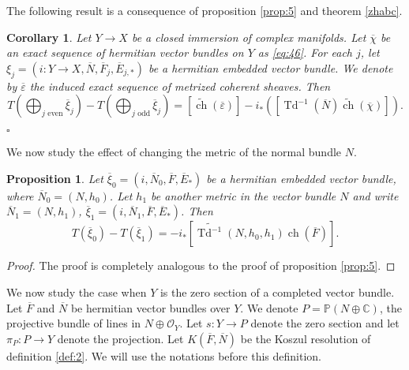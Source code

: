 \documentclass[10pt,twoside]{article}
\numberwithin{equation}{section}
\theoremstyle{plain}
\newtheorem{corollary}[equation]{Corollary}
\newtheorem{proposition}[equation]{Proposition}
\theoremstyle{definition}
\DeclareMathOperator{\Td}{Td}
\DeclareMathOperator{\ch}{ch}
\begin{document}
The following result is a consequence of proposition \ref{prop:5} and
theorem \ref{zhabc}.

\begin{corollary}\label{comparThevb} Let $Y\longrightarrow X$ be a closed immersion of
  complex manifolds.
  Let $\overline {\chi}$ be an exact sequence of hermitian vector
  bundles on $Y$ as \eqref{eq:46}. For each $j$, let
  $\xi_{j}=(i\colon Y\longrightarrow X,\overline N,\overline F_{j},\overline
  E_{j,\ast})$ be a hermitian embedded vector bundle. We denote by
  $\overline {\varepsilon }$ the induced exact sequence of metrized
  coherent sheaves. Then
  \begin{displaymath}
    T(\bigoplus_{j \text{ even} }\overline{\xi}_{j}) - T(\bigoplus
    _{j\text{ odd} }\overline {\xi}_j)=
    [\widetilde{\ch}(\overline \varepsilon )]-
    i_{\ast}([\Td^{-1}(\overline N)\widetilde{\ch}(\overline{\chi})]).
  \end{displaymath} 
\end{corollary}
\hfill$\square$


We now study the effect of changing the metric of the normal bundle
$N$.

\begin{proposition}\label{prop:15}
  Let $\overline {\xi}_{0}=(i,\overline
  N_{0},\overline F, \overline E_{\ast})$ be a hermitian embedded vector
  bundle, where $\overline N_{0}=(N,h_{0})$. Let $h_{1}$ be another
  metric in the vector bundle $N$ and 
  write $\overline N_{1}=(N,h_{1})$,  $\overline {\xi}_{1}=(i,\overline
  N_{1},\overline F, \overline E_{\ast})$. Then
  \begin{displaymath}
    T(\overline {\xi}_{0})-T(\overline
    {\xi}_{1})=-i_{\ast}[\widetilde{\Td^{-1}}(N,h_{0},h_{1})\ch(\overline
    F)].
  \end{displaymath}
\end{proposition}
\begin{proof}
  The proof is completely analogous to the proof of proposition \ref{prop:5}.  
\end{proof}

We now study the case when $Y$ is the zero section of a completed
vector bundle. Let $\overline F$ and $\overline N$ be hermitian
vector bundles over $Y$. We denote $P=\mathbb{P}(N\oplus
\mathbb{C})$, the projective bundle of lines in $N\oplus
\mathcal{O}_{Y}$. Let $s\colon Y\longrightarrow P$ denote the zero section
and let $\pi _{P}\colon P\longrightarrow Y$ denote the projection. Let
$K(\overline F,\overline N)$ be the Koszul resolution of definition
\ref{def:2}. We will use the notations before this definition.
\end{document}
